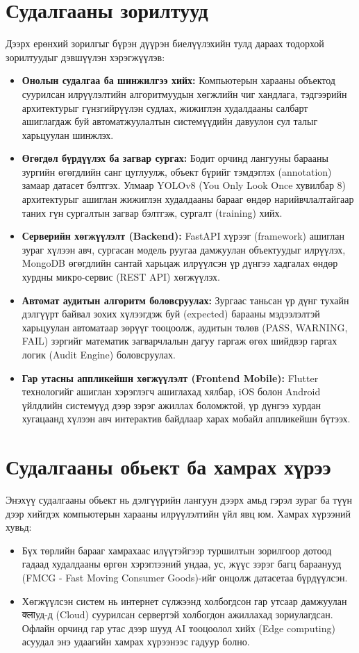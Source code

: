 \section{Судалгааны зорилтууд}
Дээрх ерөнхий зорилгыг бүрэн дүүрэн биелүүлэхийн тулд дараах тодорхой зорилтуудыг дэвшүүлэн хэрэгжүүлэв:
\begin{itemize}
    \item \textbf{Онолын судалгаа ба шинжилгээ хийх:} Компьютерын харааны объектод суурилсан илрүүлэлтийн алгоритмуудын хөгжлийн чиг хандлага, тэдгээрийн архитектурыг гүнзгийрүүлэн судлах, жижиглэн худалдааны салбарт ашиглагдаж буй автоматжуулалтын системүүдийн давуулон сул талыг харьцуулан шинжлэх.
    \item \textbf{Өгөгдөл бүрдүүлэх ба загвар сургах:} Бодит орчинд лангууны барааны зургийн өгөгдлийн санг цуглуулж, объект бүрийг тэмдэглэх (annotation) замаар датасет бэлтгэх. Улмаар YOLOv8 (You Only Look Once хувилбар 8) архитектурыг ашиглан жижиглэн худалдааны барааг өндөр нарийвчлалтайгаар таних гүн сургалтын загвар бэлтгэж, сургалт (training) хийх.
    \item \textbf{Серверийн хөгжүүлэлт (Backend):} FastAPI хүрээг (framework) ашиглан зураг хүлээн авч, сургасан модель руугаа дамжуулан объектуудыг илрүүлэх, MongoDB өгөгдлийн сантай харьцаж илрүүлсэн үр дүнгээ хадгалах өндөр хурдны микро-сервис (REST API) хөгжүүлэх.
    \item \textbf{Автомат аудитын алгоритм боловсруулах:} Зургаас таньсан үр дүнг тухайн дэлгүүрт байвал зохих хүлээгдэж буй (expected) барааны мэдээлэлтэй харьцуулан автоматаар зөрүүг тооцоолж, аудитын төлөв (PASS, WARNING, FAIL) зэргийг математик загварчлалын дагуу гаргаж өгөх шийдвэр гаргах логик (Audit Engine) боловсруулах.
    \item \textbf{Гар утасны аппликейшн хөгжүүлэлт (Frontend Mobile):} Flutter технологийг ашиглан хэрэглэгч ашиглахад хялбар, iOS болон Android үйлдлийн системүүд дээр зэрэг ажиллах боломжтой, үр дүнгээ хурдан хугацаанд хүлээн авч интерактив байдлаар харах мобайл аппликейшн бүтээх.
\end{itemize}

\section{Судалгааны обьект ба хамрах хүрээ}
Энэхүү судалгааны обьект нь дэлгүүрийн лангуун дээрх амьд гэрэл зураг ба түүн дээр хийгдэх компьютерын харааны илрүүлэлтийн үйл явц юм. Хамрах хүрээний хувьд:
\begin{itemize}
    \item Бүх төрлийн барааг хамрахаас илүүтэйгээр туршилтын зорилгоор дотоод гадаад худалдааны өргөн хэрэглээний ундаа, ус, жүүс зэрэг багц бараанууд (FMCG - Fast Moving Consumer Goods)-ийг онцолж датасетаа бүрдүүлсэн.
    \item Хөгжүүлсэн систем нь интернет сүлжээнд холбогдсон гар утсаар дамжуулан क्लाуд-д (Cloud) суурилсан сервертэй холбогдон ажиллахад зориулагдсан. Офлайн орчинд гар утас дээр шууд AI тооцоолол хийх (Edge computing) асуудал энэ удаагийн хамрах хүрээнээс гадуур болно.
\end{itemize}

